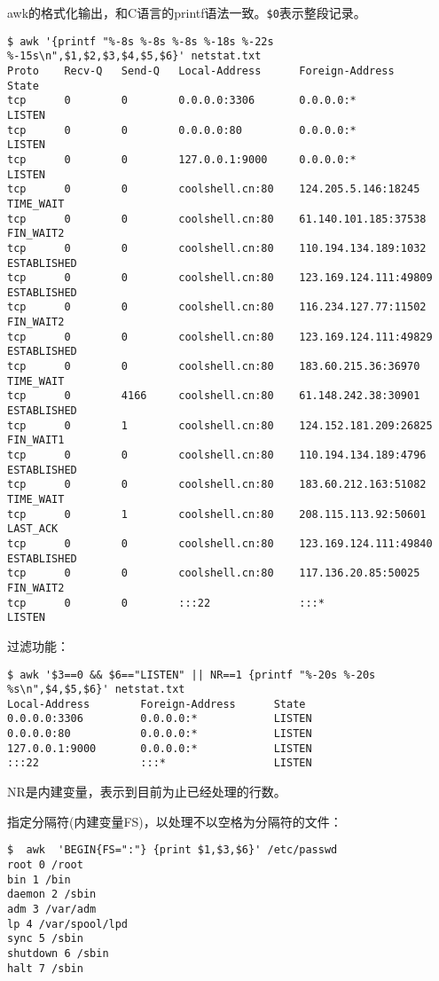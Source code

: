 awk的格式化输出，和C语言的printf语法一致。\verb|$0|表示整段记录。
\begin{verbatim}
$ awk '{printf "%-8s %-8s %-8s %-18s %-22s %-15s\n",$1,$2,$3,$4,$5,$6}' netstat.txt
Proto    Recv-Q   Send-Q   Local-Address      Foreign-Address        State
tcp      0        0        0.0.0.0:3306       0.0.0.0:*              LISTEN
tcp      0        0        0.0.0.0:80         0.0.0.0:*              LISTEN
tcp      0        0        127.0.0.1:9000     0.0.0.0:*              LISTEN
tcp      0        0        coolshell.cn:80    124.205.5.146:18245    TIME_WAIT
tcp      0        0        coolshell.cn:80    61.140.101.185:37538   FIN_WAIT2
tcp      0        0        coolshell.cn:80    110.194.134.189:1032   ESTABLISHED
tcp      0        0        coolshell.cn:80    123.169.124.111:49809  ESTABLISHED
tcp      0        0        coolshell.cn:80    116.234.127.77:11502   FIN_WAIT2
tcp      0        0        coolshell.cn:80    123.169.124.111:49829  ESTABLISHED
tcp      0        0        coolshell.cn:80    183.60.215.36:36970    TIME_WAIT
tcp      0        4166     coolshell.cn:80    61.148.242.38:30901    ESTABLISHED
tcp      0        1        coolshell.cn:80    124.152.181.209:26825  FIN_WAIT1
tcp      0        0        coolshell.cn:80    110.194.134.189:4796   ESTABLISHED
tcp      0        0        coolshell.cn:80    183.60.212.163:51082   TIME_WAIT
tcp      0        1        coolshell.cn:80    208.115.113.92:50601   LAST_ACK
tcp      0        0        coolshell.cn:80    123.169.124.111:49840  ESTABLISHED
tcp      0        0        coolshell.cn:80    117.136.20.85:50025    FIN_WAIT2
tcp      0        0        :::22              :::*                   LISTEN
\end{verbatim}

过滤功能：
\begin{verbatim}
$ awk '$3==0 && $6=="LISTEN" || NR==1 {printf "%-20s %-20s %s\n",$4,$5,$6}' netstat.txt
Local-Address        Foreign-Address      State
0.0.0.0:3306         0.0.0.0:*            LISTEN
0.0.0.0:80           0.0.0.0:*            LISTEN
127.0.0.1:9000       0.0.0.0:*            LISTEN
:::22                :::*                 LISTEN
\end{verbatim}
NR是内建变量，表示到目前为止已经处理的行数。

指定分隔符(内建变量FS)，以处理不以空格为分隔符的文件：
\begin{verbatim}
$  awk  'BEGIN{FS=":"} {print $1,$3,$6}' /etc/passwd
root 0 /root
bin 1 /bin
daemon 2 /sbin
adm 3 /var/adm
lp 4 /var/spool/lpd
sync 5 /sbin
shutdown 6 /sbin
halt 7 /sbin
\end{verbatim}


